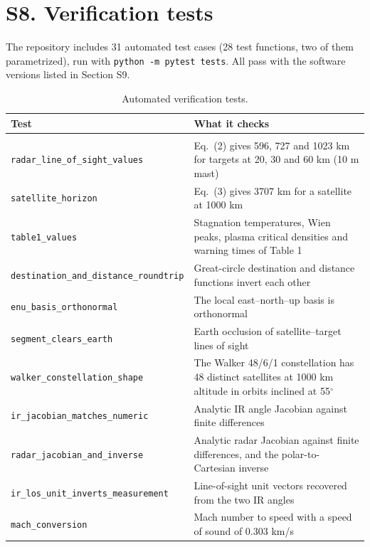 \documentclass[11pt,a4paper]{article}
\begin{document}
\section*{S8. Verification tests}

The repository includes 31 automated test cases (28 test functions, two of them parametrized), run with \texttt{python -m pytest tests}. All pass with the software versions listed in Section S9.

\begin{table}[!htbp]
\caption{Automated verification tests.}
\label{tab:S13}
\centering\footnotesize
\begin{tabular}{@{}>{\raggedright\arraybackslash}p{}>{\raggedright\arraybackslash}p{}@{}}
\toprule
Test & What it checks \\
\midrule
\multicolumn{2}{@{}l}{\textit{Physics and geometry (\texttt{tests/test\_physics\_geometry.py})}} \\
\nolinkurl{radar_line_of_sight_values} & Eq.~(2) gives 596, 727 and 1023 km for targets at 20, 30 and 60 km (10 m mast) \\
\nolinkurl{satellite_horizon} & Eq.~(3) gives 3707 km for a satellite at 1000 km \\
\nolinkurl{table1_values} & Stagnation temperatures, Wien peaks, plasma critical densities and warning times of Table 1 \\
\nolinkurl{destination_and_distance_roundtrip} & Great-circle destination and distance functions invert each other \\
\nolinkurl{enu_basis_orthonormal} & The local east--north--up basis is orthonormal \\
\nolinkurl{segment_clears_earth} & Earth occlusion of satellite--target lines of sight \\
\nolinkurl{walker_constellation_shape} & The Walker 48/6/1 constellation has 48 distinct satellites at 1000 km altitude in orbits inclined at 55$^\circ$ \\
\nolinkurl{ir_jacobian_matches_numeric} & Analytic IR angle Jacobian against finite differences \\
\nolinkurl{radar_jacobian_and_inverse} & Analytic radar Jacobian against finite differences, and the polar-to-Cartesian inverse \\
\nolinkurl{ir_los_unit_inverts_measurement} & Line-of-sight unit vectors recovered from the two IR angles \\
\nolinkurl{mach_conversion} & Mach number to speed with a speed of sound of 0.303 km/s \\

\end{tabular}
\end{table}
\end{document}
